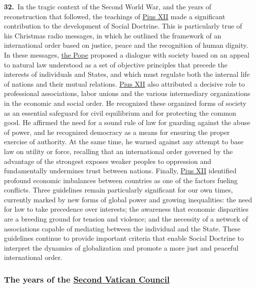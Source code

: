 \documentclass{article}
\begin{document}
\textbf{32.}\ In the tragic context of the Second World War, and the years of reconstruction that followed, the teachings of \href{https://www.vatican.va/content/pius-xii/en.html}{Pius XII} made a significant contribution to the development of Social Doctrine. This is particularly true of his Christmas radio messages, in which he outlined the framework of an international order based on justice, peace and the recognition of human dignity. In these messages, \href{https://www.vatican.va/content/pius-xii/en.html}{the Pope} proposed a dialogue with society based on an appeal to natural law understood as a set of objective principles that precede the interests of individuals and States, and which must regulate both the internal life of nations and their mutual relations. \href{https://www.vatican.va/content/pius-xii/en.html}{Pius XII} also attributed a decisive role to professional associations, labor unions and the various intermediary organizations in the economic and social order. He recognized these organized forms of society as an essential safeguard for civil equilibrium and for protecting the common good. He affirmed the need for a sound rule of law for guarding against the abuse of power, and he recognized democracy as a means for ensuring the proper exercise of authority. At the same time, he warned against any attempt to base law on utility or force, recalling that an international order governed by the advantage of the strongest exposes weaker peoples to oppression and fundamentally undermines trust between nations. Finally, \href{https://www.vatican.va/content/pius-xii/en.html}{Pius XII} identified profound economic imbalances between countries as one of the factors fueling conflicts.\cite{n26} Three guidelines remain particularly significant for our own times, currently marked by new forms of global power and growing inequalities: the need for law to take precedence over interests; the awareness that economic disparities are a breeding ground for tension and violence; and the necessity of a network of associations capable of mediating between the individual and the State. These guidelines continue to provide important criteria that enable Social Doctrine to interpret the dynamics of globalization and promote a more just and peaceful international order.

\subsubsection[The years of the Second Vatican Council]{The years of the \href{https://www.vatican.va/archive/hist_councils/ii_vatican_council/index.htm}{Second Vatican Council}}
\end{document}
